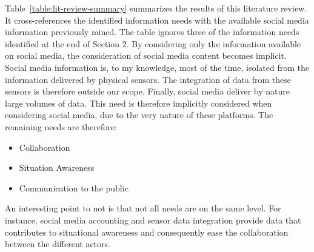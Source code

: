 Table~\ref{table:lit-review-summary} summarizes the results of this literature review.
It cross-references the identified information needs with the available social media information previously mined.
The table ignores three of the information needs identified at the end of Section 2.
By considering only the information available on social media, the consideration of social media content becomes implicit.
Social media information is, to my knowledge, most of the time, isolated from the information delivered by physical sensors.
The integration of data from these sensors is therefore outside our scope.
Finally, social media deliver by nature large volumes of data.
This need is therefore implicitly considered when considering social media, due to the very nature of these platforms.
The remaining needs are therefore:

\begin{itemize}
    \item Collaboration
    \item Situation Awareness
    \item Communication to the public
\end{itemize}

An interesting point to not is that not all needs are on the same level.
For instance, social media accounting and sensor data integration provide data that contributes to situational awareness and consequently ease the collaboration between the different actors.

